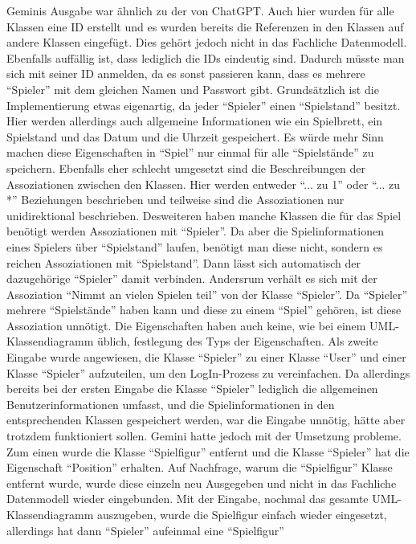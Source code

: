 Geminis Ausgabe war ähnlich zu der von ChatGPT. Auch hier wurden für alle Klassen eine ID erstellt und es wurden bereits die Referenzen in den Klassen auf andere Klassen
eingefügt. Dies gehört jedoch nicht in das Fachliche Datenmodell. Ebenfalls auffällig ist, dass lediglich die IDs eindeutig sind. Dadurch müsste man sich mit seiner ID
anmelden, da es sonst passieren kann, dass es mehrere ``Spieler'' mit dem gleichen Namen und Passwort gibt. Grundsätzlich ist die Implementierung etwas eigenartig, da jeder 
``Spieler'' einen ``Spielstand'' besitzt. Hier werden allerdings auch allgemeine Informationen wie ein Spielbrett, ein Spielstand und das Datum und die Uhrzeit gespeichert. 
Es würde mehr Sinn machen diese Eigenschaften in ``Spiel'' nur einmal für alle ``Spielstände'' zu speichern. Ebenfalls eher schlecht umgesetzt sind die Beschreibungen 
der Assoziationen zwischen den Klassen. Hier werden entweder ``... zu 1'' oder ``... zu *'' Beziehungen beschrieben und teilweise sind die Assoziationen nur unidirektional 
beschrieben. Desweiteren haben manche Klassen die für das Spiel benötigt werden Assoziationen mit ``Spieler''. Da aber die Spielinformationen eines Spielers über 
``Spielstand'' laufen, benötigt man diese nicht, sondern es reichen Assoziationen mit ``Spielstand''. Dann lässt sich automatisch der dazugehörige ``Spieler'' 
damit verbinden. Andersrum verhält es sich mit der Assoziation ``Nimmt an vielen Spielen teil'' von der Klasse ``Spieler''. Da ``Spieler'' mehrere ``Spielstände'' haben 
kann und diese zu einem ``Spiel'' gehören, ist diese Assoziation unnötigt. Die Eigenschaften haben auch keine, wie bei einem UML-Klassendiagramm üblich, festlegung des 
Typs der Eigenschaften. Als zweite Eingabe wurde angewiesen, die Klasse ``Spieler'' zu einer Klasse ``User'' und einer 
Klasse ``Spieler'' aufzuteilen, um den LogIn-Prozess zu vereinfachen. Da allerdings bereits bei der ersten Eingabe die Klasse ``Spieler'' lediglich die allgemeinen 
Benutzerinformationen umfasst, und die Spielinformationen in den entsprechenden Klassen gespeichert werden, war die Eingabe unnötig, hätte aber trotzdem funktioniert sollen.
Gemini hatte jedoch mit der Umsetzung probleme. Zum einen wurde die Klasse ``Spielfigur'' entfernt und die Klasse ``Spieler'' hat die Eigenschaft ``Position'' erhalten.
Auf Nachfrage, warum die ``Spielfigur'' Klasse entfernt wurde, wurde diese einzeln neu Ausgegeben und nicht in das Fachliche Datenmodell wieder eingebunden. Mit der 
Eingabe, nochmal das gesamte UML-Klassendiagramm auszugeben, wurde die Spielfigur einfach wieder eingesetzt, allerdings hat dann ``Spieler'' aufeinmal eine ``Spielfigur''
